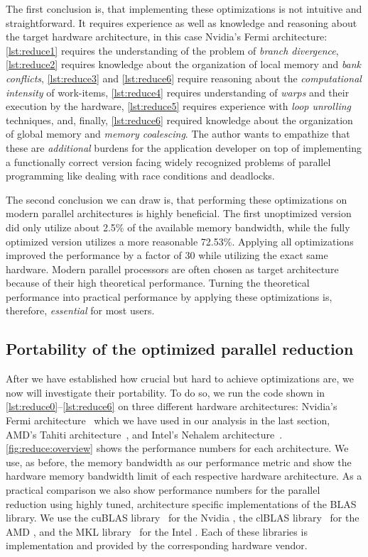 The first conclusion is, that implementing these optimizations is not intuitive and straightforward.
It requires experience as well as knowledge and reasoning about the target hardware architecture, in this case Nvidia's Fermi \GPU architecture:
\autoref{lst:reduce1} requires the understanding of the problem of \emph{branch divergence}, \autoref{lst:reduce2} requires knowledge about the organization of local memory and \emph{bank conflicts}, \autoref{lst:reduce3} and \autoref{lst:reduce6} require reasoning about the \emph{computational intensity} of work-items, \autoref{lst:reduce4} requires understanding of \emph{warps} and their execution by the hardware, \autoref{lst:reduce5} requires experience with \emph{loop unrolling} techniques, and, finally, \autoref{lst:reduce6} required knowledge about the organization of global memory and \emph{memory coalescing}.
The author wants to empathize that these are \emph{additional} burdens for the application developer on top of implementing a functionally correct version facing widely recognized problems of parallel programming like dealing with race conditions and deadlocks.

The second conclusion we can draw is, that performing these optimizations on modern parallel architectures is highly beneficial.
The first unoptimized version did only utilize about 2.5\% of the available memory bandwidth, while the fully optimized version utilizes a more reasonable 72.53\%.
Applying all optimizations improved the performance by a factor of $30$ while utilizing the exact same hardware.
Modern parallel processors are often chosen as target architecture because of their high theoretical performance.
Turning the theoretical performance into practical performance by applying these optimizations is, therefore, \emph{essential} for most users.





\subsection{Portability of the optimized parallel reduction}
After we have established how crucial but hard to achieve optimizations are, we now will investigate their portability.
To do so, we run the code shown in \autoref{lst:reduce0}--\ref{lst:reduce6} on three different hardware architectures:
Nvidia's Fermi \GPU architecture~\cite{} which we have used in our analysis in the last section, AMD's Tahiti \GPU architecture~\cite{}, and Intel's Nehalem \CPU architecture~\cite{}.
\autoref{fig:reduce:overview} shows the performance numbers for each architecture.
We use, as before, the memory bandwidth as our performance metric and show the hardware memory bandwidth limit of each respective hardware architecture.
As a practical comparison we also show performance numbers for the parallel reduction using highly tuned, architecture specific implementations of the BLAS library.
We use the cuBLAS library~\cite{} for the Nvidia \GPU, the clBLAS library~\cite{} for the AMD \GPU, and the MKL library~\cite{} for the Intel \CPU.
Each of these libraries is implementation and provided by the corresponding hardware vendor.

